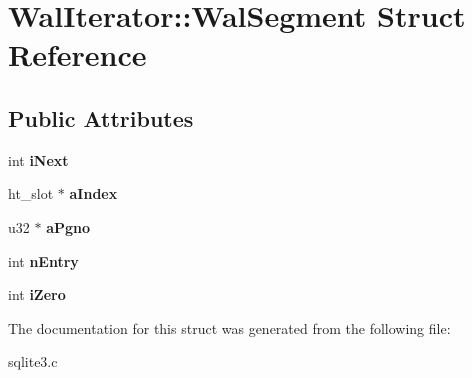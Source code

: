 \hypertarget{structWalIterator_1_1WalSegment}{}\section{Wal\+Iterator\+:\+:Wal\+Segment Struct Reference}
\label{structWalIterator_1_1WalSegment}
\subsection*{Public Attributes}
\begin{DoxyCompactItemize}
\item 
int {\bfseries i\+Next}\hypertarget{structWalIterator_1_1WalSegment_a329c939b196f907fe98cf762bb07d291}{}\label{structWalIterator_1_1WalSegment_a329c939b196f907fe98cf762bb07d291}

\item 
ht\+\_\+slot $\ast$ {\bfseries a\+Index}\hypertarget{structWalIterator_1_1WalSegment_adec397836a127acafcc551cb1fdcd851}{}\label{structWalIterator_1_1WalSegment_adec397836a127acafcc551cb1fdcd851}

\item 
u32 $\ast$ {\bfseries a\+Pgno}\hypertarget{structWalIterator_1_1WalSegment_a5e43273a11dc5856934834c0cdf7f198}{}\label{structWalIterator_1_1WalSegment_a5e43273a11dc5856934834c0cdf7f198}

\item 
int {\bfseries n\+Entry}\hypertarget{structWalIterator_1_1WalSegment_ad80cf479aa670eda7aa1adee607af7d9}{}\label{structWalIterator_1_1WalSegment_ad80cf479aa670eda7aa1adee607af7d9}

\item 
int {\bfseries i\+Zero}\hypertarget{structWalIterator_1_1WalSegment_a3eedec5e8e8dd94be670d50ac144a959}{}\label{structWalIterator_1_1WalSegment_a3eedec5e8e8dd94be670d50ac144a959}

\end{DoxyCompactItemize}


The documentation for this struct was generated from the following file\+:\begin{DoxyCompactItemize}
\item 
sqlite3.\+c\end{DoxyCompactItemize}
